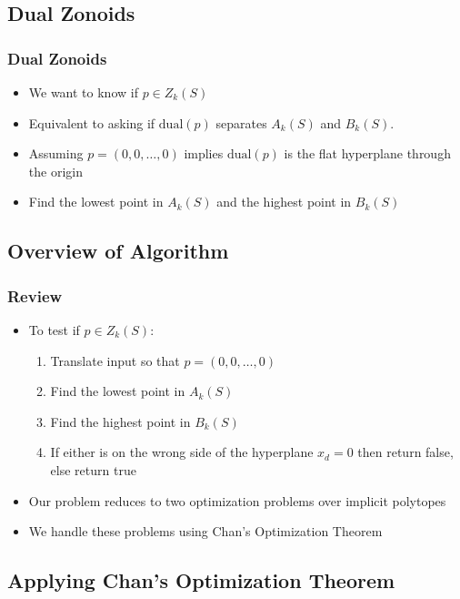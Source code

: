 \documentclass{beamer}
\begin{document}
\subsection{Dual Zonoids}
\frame
{
   \frametitle{Dual Zonoids}
   \begin{itemize}
     \item<1-> We want to know if $p\in Z_k(S)$
      \begin{center}
      \end{center}
     \item<2-> Equivalent to asking if $\mathrm{dual}(p)$ separates 
	$A_k(S)$ and $B_k(S)$.
     \item<3-> Assuming $p=(0,0,\ldots,0)$ implies $\mathrm{dual}(p)$ 
	is the flat hyperplane through the origin
     \item<4-> Find the lowest point in $A_k(S)$ and the highest point
	in $B_k(S)$ 
   \end{itemize}
}

\subsection{Overview of Algorithm}
\frame
{
     \frametitle{Review}
     \begin{itemize}
     \item<1-> To test if $p\in Z_k(S)$:
     \begin{enumerate}
      \item<2-> Translate input so that $p=(0,0,\ldots,0)$
      \item<3-> Find the lowest point in $A_k(S)$
      \item<4-> Find the highest point in $B_k(S)$
      \item<5-> If either is on the wrong side of the hyperplane
	$x_d=0$ then return false, else return true
     \end{enumerate}
     \item<6->{Our problem reduces to two optimization problems over
	implicit polytopes \\}
     \item<7->{We handle these problems using Chan's Optimization Theorem}
    \end{itemize} 
}

\subsection{Applying Chan's Optimization Theorem}
\end{document}
